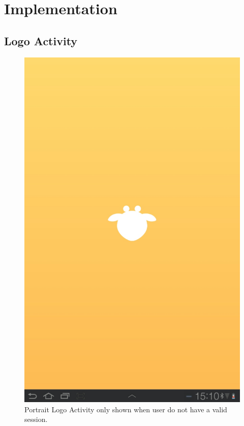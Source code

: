 \appendix
\chapter{Implementation}
\section{Logo Activity}
\begin{figure}[h!]
	\centering
	\includegraphics[scale=0.3]{gfx/logo-activity_1.jpg}
	\caption{Portrait Logo Activity only shown when user do not have a valid session.}
	\label{fig:logo-activity_1}
\end{figure}
